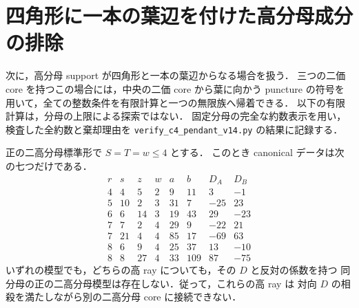 \section{四角形に一本の葉辺を付けた高分母成分の排除}
\label{cp14:section}

次に，高分母 support が四角形と一本の葉辺からなる場合を扱う．
三つの二価 core を持つこの場合には，中央の二価 core から葉に向かう
puncture の符号を用いて，全ての整数条件を有限計算と一つの無限族へ帰着できる．
以下の有限計算は，分母の上限による探索ではない．
固定分母の完全な約数表示を用い，検査した全約数と棄却理由を
\texttt{verify\_c4\_pendant\_v14.py} の結果に記録する．

\begin{lemma}[小さい負の枝の完全分類と接続障害]
\label{cp14:small-negative}
正の二高分母標準形で $S=T=w\leq4$ とする．
このとき canonical データは次の七つだけである．
\[
\begin{array}{rrrr|rr|rr}
r&s&z&w&a&b&D_A&D_B\\\hline
4&4&5&2&9&11&3&-1\\
5&10&2&3&31&7&-25&23\\
6&6&14&3&19&43&29&-23\\
7&7&2&4&29&9&-22&21\\
7&21&4&4&85&17&-69&63\\
8&6&9&4&25&37&13&-10\\
8&8&27&4&33&109&87&-75
\end{array}
\]
いずれの模型でも，どちらの高 ray についても，その $D$ と反対の係数を持つ
同分母の正の二高分母模型は存在しない．従って，これらの高 ray は
対向 $D$ の相殺を満たしながら別の二高分母 core に接続できない．
\end{lemma}

